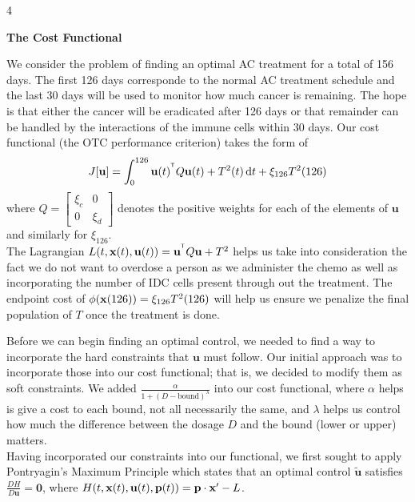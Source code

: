 \documentclass[a0]{4by3}
\newcommand{\NumColumns}{4}
\begin{document}
\begin{minipage}{\linewidth + 2\fboxsep}
\begin{multicols*}{\NumColumns}
        \begin{center}
        \vspace{2cm}
        \LARGE{\textbf{The Cost Functional}}
        \end{center}
         	\large
         
We consider the problem of finding an optimal AC treatment for a total of 156 days.
The first 126 days corresponde to the normal AC treatment schedule and the last 30 days will be used to monitor how much cancer is remaining. 
The hope is that either the cancer will be eradicated after 126 days or that remainder can be handled by the interactions of the immune cells within 30 days.
Our cost functional (the OTC performance criterion) takes the form of 
\begin{align*}
	J[\mathbf{u}] = \int_0^{126}\mathbf{u}(t)^{^{\mathsf T}} Q \mathbf{u}(t)+ T^2(t) \mathop{}\!\mathrm{d} t + \xi_{126} T^2(126)
\end{align*}
where $Q = \begin{bmatrix} \xi_c & 0 \\ 0 & \xi_d \end{bmatrix}$ denotes the positive weights for each of the elements of $\mathbf{u}$ and similarly for $ \xi_{126}$.\\

The Lagrangian $L(t, \mathbf{x}(t),\mathbf{u}(t))=\mathbf{u}^{^{\mathsf T}} Q \mathbf{u}+ T^2$ helps us take into consideration the fact we do not want to overdose a person as we administer the chemo as well as incorporating the number of IDC cells present through out the treatment.
The endpoint cost of $\phi(\mathbf{x}(126)) = \xi_{126} T^2(126)$ will help us ensure we penalize the final population of $T$ once the treatment is done. 

\vspace{-6mm}
            \large 

Before we can begin finding an optimal control, we needed to find a way to incorporate the hard constraints that $\mathbf{u}$ must follow. 
Our initial approach was to incorporate those into our cost functional; that is, we decided to modify them as soft constraints.
We added $\frac{\alpha}{1 + (D - \text{bound})^{\lambda}}$ into our cost functional, where $\alpha$ helps is give a cost to each bound, not all necessarily the same, and $\lambda$ helps us control how much the difference between the dosage $D$ and the bound (lower or upper) matters.\\
            

Having incorporated our constraints into our functional, we first sought to apply Pontryagin's Maximum Principle which states that an optimal control $\tilde{\mathbf{u}}$ satisfies $\frac{DH}{D\mathbf{u}} = \mathbf{0}$, where $H(t, \mathbf{x}(t), \mathbf{u}(t),\mathbf{p}(t)) = \mathbf{p}\cdot \mathbf{x}^\prime - L$.




\end{multicols*}
\end{minipage}
\end{document}
